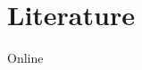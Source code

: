   \section{Literature}
  \begin{frame}{Online}
    \nocite{noauthor_download_nodate}
    \printbibliography[type=online,heading=subbibliography,title={Online}]
  \end{frame}

